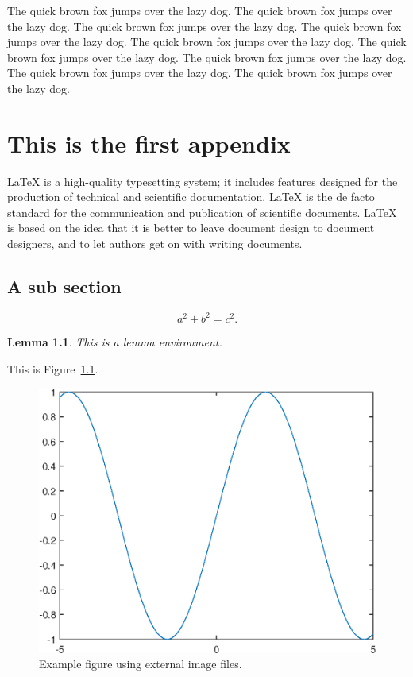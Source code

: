 \documentclass[openany,twoside,12pt]{book}
\theoremstyle{plain}
\newtheorem{lemma}{Lemma}[chapter]
\numberwithin{equation}{chapter}
\numberwithin{figure}{chapter}
\numberwithin{table}{chapter}
\begin{document}
The quick brown fox jumps over the lazy dog. The quick brown fox jumps over the lazy dog. The quick brown fox jumps over the lazy dog. The quick brown fox jumps over the lazy dog. The quick brown fox jumps over the lazy dog. The quick brown fox jumps over the lazy dog. The quick brown fox jumps over the lazy dog. The quick brown fox jumps over the lazy dog. The quick brown fox jumps over the lazy dog.



\appendix

\chapter{This is the first appendix}

LaTeX is a high-quality typesetting system; it includes features designed
for the production of technical and scientific documentation.
LaTeX is the de facto standard for the communication and publication of scientific documents.
LaTeX is based on the idea that it is better to leave document design to
document designers, and to let authors get on with writing documents.

\section{A sub section}

\begin{equation}\label{eq:abc}
  a^2+b^2=c^2.
\end{equation}

\begin{lemma}
This is a lemma environment.
\end{lemma}

This is Figure~\ref{fig:sinx2}.
\begin{figure}[htp!]
  \centering
  \includegraphics[width=0.48\linewidth]{image1}
  \caption{Example figure using external image files.}
  \label{fig:sinx2}
\end{figure}
\end{document}
